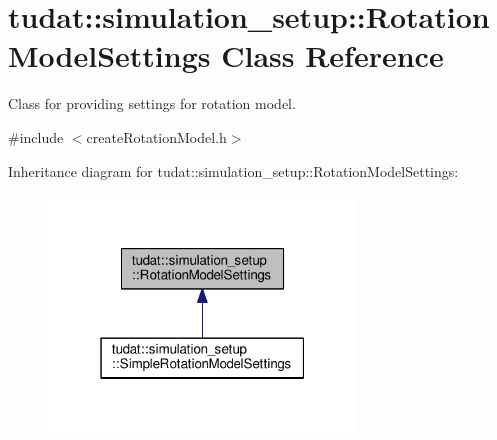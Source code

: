 \hypertarget{classtudat_1_1simulation__setup_1_1RotationModelSettings}{}\section{tudat\+:\+:simulation\+\_\+setup\+:\+:Rotation\+Model\+Settings Class Reference}
\label{classtudat_1_1simulation__setup_1_1RotationModelSettings}


Class for providing settings for rotation model.  




{\ttfamily \#include $<$create\+Rotation\+Model.\+h$>$}



Inheritance diagram for tudat\+:\+:simulation\+\_\+setup\+:\+:Rotation\+Model\+Settings\+:
\nopagebreak
\begin{figure}[H]
\begin{center}
\leavevmode
\includegraphics[width=232pt]{classtudat_1_1simulation__setup_1_1RotationModelSettings__inherit__graph}
\end{center}
\end{figure}
